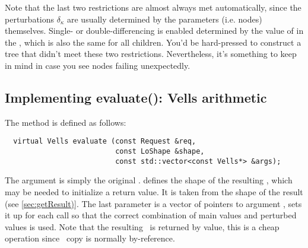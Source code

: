   Note that the last two restrictions are almost always met automatically,
  since the perturbations $\delta_\kappa$ are usually determined by the
  parameters (i.e.  nodes) themselves. Single- or double-differencing
  is enabled determined by the value of  in the \Request, which
  is also the same for all children. You'd be hard-pressed to construct a tree
  that didn't meet these two restrictions. Nevertheless, it's something to keep
  in mind in case you see  nodes failing unexpectedly.

\subsection{Implementing evaluate(): Vells arithmetic}

  The  method is defined as follows:
  
  \begin{verbatim}  
  virtual Vells evaluate (const Request &req,
                          const LoShape &shape,
                          const std::vector<const Vells*> &args);
  \end{verbatim}
  
  The  argument is simply the original \Request.  defines the
  shape of the resulting \Vells, which may be needed to initialize a return
  value. It is taken from the shape of the result \Cells (see
  \ref{sec:getResult)}. The last parameter is a vector of pointers to argument
  \Vells,  sets it up for each call so that the correct combination
  of main values and perturbed values is used. Note that the resulting \Vells\
  is returned by value, this is a cheap operation since \Vells\ copy is normally
  by-reference.
  
